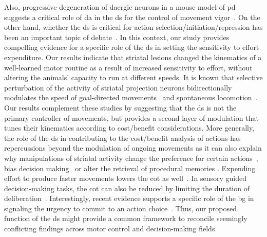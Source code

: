 Also, progressive degeneration of \gls{da}ergic neurons in a mouse model of \gls{pd} suggests a critical role of \gls{da} in the \gls{ds} for the control of movement vigor~\cite{Panigrahi2015Cell}.
On the other hand, whether the \gls{ds} is critical for action selection/initiation/repression has been an important topic of debate~\cite{Turner2010CurrOpinNeurobiol, Dudman2016CurrOpinNeurobiol}. 
In this context, our study provides compelling evidence for a specific role of the \gls{ds} in setting the sensitivity to effort expenditure.
Our results indicate that striatal lesions changed the kinematics of a well-learned motor routine as a result of increased sensitivity to effort, without altering the animals' capacity to run at different speeds.
It is known that selective perturbation of the activity of striatal projection neurons bidirectionally modulates the speed of goal-directed movements~\cite{Yttri2016Nature} and spontaneous locomotion~\cite{Kravitz2010Nature}. 
Our results complement these studies by suggesting that the \gls{ds} is not the primary controller of movements, but provides a second layer of modulation that tunes their kinematics according to cost/benefit considerations.
More generally, the role of the \gls{ds} in contributing to the cost/benefit analysis of actions has repercussions beyond the modulation of ongoing movements as it can also explain why manipulations of striatal activity change the preference for certain actions~\cite{Kravitz2012NN}, bias decision making~\cite{Tai2012NN} or alter the retrieval of procedural memories \cite{Geddes2018Cell}.
Expending effort to produce faster movements lowers the \gls{cot} as well~\cite{Shadmehr2019TINS}.
In sensory guided decision-making tasks, the \gls{cot} can also be reduced by limiting the duration of deliberation~\cite{Carland2019NeuroSci}.
Interestingly, recent evidence supports a specific role of the \gls{bg} in signaling the urgency to commit to an action choice~\cite{Thura2017Neruon,Carland2019NeuroSci}.
Thus, our proposed function of the \gls{ds} might provide a common framework to reconcile seemingly conflicting findings across motor control and decision-making fields.
